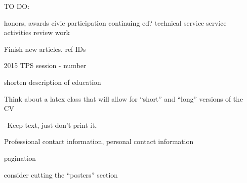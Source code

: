 TO DO:

honors, awards
civic participation
continuing ed?
technical service
service activities
review work

Finish new articles, ref IDs

2015 TPS session - number

shorten description of education

Think about a latex class that will allow for ``short'' and ``long'' versions of the CV

--Keep text, just don't print it.

Professional contact information, personal contact information

pagination

consider cutting the ``posters'' section



